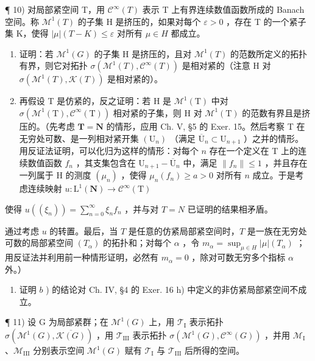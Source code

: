 ¶ 10) 对局部紧空间 T，用 \(\mathcal{C}^{\infty}(T)\) 表示 T 上有界连续数值函数所成的 Banach 空间。称 \(\mathcal{M}^{1}(T)\) 的子集 H 是挤压的，如果对每个 \(\varepsilon > 0\) ，存在 T 的一个紧子集 K，使得 \(|\mu|(T - K) \leqslant \varepsilon\) 对所有 \(\mu \in H\) 都成立。

\begin{enumerate}
\def\labelenumi{\alph{enumi})}
\item
  证明：若 \(\mathcal{M}^{1}(G)\) 的子集 H 是挤压的，且对 \(\mathcal{M}^{1}(T)\) 的范数所定义的拓扑有界，则它对拓扑 \(\sigma(\mathcal{M}^{1}(T),\mathcal{C}^{\infty}(T))\) 是相对紧的（注意 H 对 \(\sigma(\mathcal{M}^{1}(T),\mathcal{K}(T))\) 是相对紧的）。
\item
  再假设 T 是仿紧的，反之证明：若 H 是 \(\mathcal{M}^1 (\mathrm{T})\) 中对 \(\sigma (\mathcal{M}^1 (\mathrm{T}),\mathcal{C}^\infty (\mathrm{T}))\) 相对紧的子集，则 H 对 \(\mathcal{M}^1 (\mathrm{T})\) 的范数有界且是挤压的。（先考虑 \(\mathbf{T} = \mathbf{N}\) 的情形，应用 Ch. V, §5 的 Exer. 15。然后考察 T 在无穷处可数、是一列相对紧开集 \((\mathrm{U}_n)\) （满足 \(\overline{\mathrm{U}}_n\subset \mathrm{U}_{n + 1}\) ）之并的情形。用反证法证明，可以化归为这样的情形：对每个 \(n\) 存在一个定义在 T 上的连续数值函数 \(f_{n}\) ，其支集包含在 \(\mathrm{U}_{n + 1} - \overline{\mathrm{U}}_n\) 中，满足 \(\| f_n\| \leqslant 1\) ，并且存在一列属于 H 的测度 \((\mu_n)\) ，使得 \(\mu_{n}(f_{n})\geqslant a > 0\) 对所有 \(n\) 成立。于是考虑连续映射 \(u:\mathrm{L}^{1}(\mathbf{N})\to \mathcal{C}^{\infty}(\mathrm{T})\)
\end{enumerate}

使得 \(u((\xi_n)) = \sum_{n=0}^{\infty} \xi_n f_n\) ，并与对 \(T = N\) 已证明的结果相矛盾。

通过考虑 \(u\) 的转置。最后，当 \(T\) 是任意的仿紧局部紧空间时，\(T\) 是一族在无穷处可数的局部紧空间 \((T_{\alpha})\) 的拓扑和；对每个 \(\alpha\) ，令 \(m_{\alpha} = \sup_{\mu \in H} |\mu|(T_{\alpha})\) ；用反证法并利用前一种情形证明，必然有 \(m_{\alpha} = 0\) ，除对可数无穷多个指标 \(\alpha\) 外。）

\begin{enumerate}
\def\labelenumi{\alph{enumi})}
\setcounter{enumi}{2}
\tightlist
\item
  证明 \(b\) ) 的结论对 Ch. IV, §4 的 Exer. 16 h) 中定义的非仿紧局部紧空间不成立。
\end{enumerate}

¶ 11) 设 G 为局部紧群；在 \(\mathcal{M}^{1}(G)\) 上，用 \(\mathcal{T}_{\mathrm{I}}\) 表示拓扑 \(\sigma(\mathcal{M}^{1}(G), \overline{\mathcal{K}(G)})\) ，用 \(\mathcal{T}_{\mathrm{III}}\) 表示拓扑 \(\sigma(\mathcal{M}^{1}(G), \mathcal{C}^{\infty}(G))\) ，并用 \(\mathcal{M}_{\mathrm{I}}\) 、\(\mathcal{M}_{\mathrm{III}}\) 分别表示空间 \(\mathcal{M}^{1}(G)\) 赋有 \(\mathcal{T}_{\mathrm{I}}\) 与 \(\mathcal{T}_{\mathrm{III}}\) 后所得的空间。

